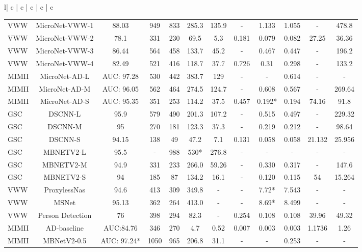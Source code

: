 \documentclass{article}
\begin{document}
\begin{table}[t]
\begin{tabular}{l| c | c | c | c | c}
\begin{table*}[t]
{\begin{tabular}{l|c|c|c|c|c|c|c|c|c|c|c}
VWW & MicroNet-VWW-1 & 88.03 &949  & 833 & 285.3 & 135.9 & - & 1.133 &1.055  &-  &478.8 \\
VWW & MicroNet-VWW-2 & 78.1 &331  & 230 & 69.5 & 5.3 & 0.181 & 0.079 &0.082 &27.25  &36.36 \\
VWW & MicroNet-VWW-3 & 86.44 &564  & 458 & 133.7 & 45.2 & - & 0.467 &0.447 &-  &196.2 \\
VWW & MicroNet-VWW-4 & 82.49 &521  & 416 & 118.7 & 37.7 & 0.726 & 0.31 &0.298 &-  &133.2 \\

MIMII &MicroNet-AD-L &AUC: 97.28 &530 &442 &383.7 &129 &- &- &0.614 &- &- \\
MIMII &MicroNet-AD-M &AUC: 96.05 &562 &464 &274.5 &124.7 &- &0.608 &0.567 &- &269.64 \\
MIMII &MicroNet-AD-S &AUC: 95.35 &351 &253 &114.2 &37.5 &0.457 &0.192* &0.194 &74.16 &91.8 \\
\hline
GSC &DSCNN-L &95.9 &579 &490 &201.3 &107.2 &- &0.515 &0.497 &- &229.32 \\
GSC &DSCNN-M &95 &270 &181 &123.3 &37.3 &- &0.219 &0.212 &- &98.64 \\
GSC &DSCNN-S &94.15 &138 &49 &47.2 &7.1 &0.131 &0.058 &0.058 &21.132 &25.956 \\
GSC &MBNETV2-L &95.5 &- &988 &530* &276.8 &- &- &- &- &- \\
GSC &MBNETV2-M &94.9 &331 &233 &266.0 &59.26 &- &0.330 &0.317 &- &147.6 \\
GSC &MBNETV2-S &94 &185 &87 &134.2 &16.1 &- &0.120 &0.115 &54 &15.264 \\
VWW &ProxylessNas &94.6 &413 &309 &349.8 &- &- &7.72* &7.543 &- &- \\
VWW &MSNet &95.13 &362 &264 &413.0 &- &- &8.69* &8.499 &- &- \\
VWW &Person Detection &76 &398 &294 &82.3 &- &0.254 &0.108 &0.108 &39.96 &49.32 \\
MIMII &AD-baseline &AUC:84.76 &346 &270 &4.7 &0.52 &0.007 &0.003 &0.003 &1.1736 &1.26 \\
MIMII &MBNetV2-0.5 &AUC: 97.24* &1050 &965 &206.8 &31.1 &- &- &0.253 &- &- \\
\bottomrule
\end{tabular}}
\end{table*}


\end{tabular}
\end{table}
\end{document}
